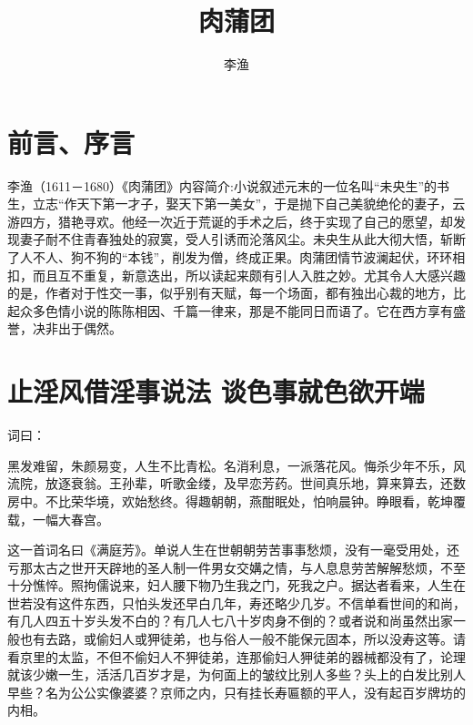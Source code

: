 \documentclass[a4paper,12pt,UTF8,twoside]{ctexbook}
\title{\heiti\zihao{0} 肉蒲团}
\author{李渔}
\date{}
\begin{document}
\maketitle
\tableofcontents

\frontmatter
\chapter{前言、序言}

李渔（1611－1680）《肉蒲团》内容简介:小说叙述元末的一位名叫“未央生”的书生，立志“作天下第一才子，娶天下第一美女”，于是抛下自己美貌绝伦的妻子，云游四方，猎艳寻欢。他经一次近于荒诞的手术之后，终于实现了自己的愿望，却发现妻子耐不住青春独处的寂寞，受人引诱而沦落风尘。未央生从此大彻大悟，斩断了人不人、狗不狗的“本钱”，削发为僧，终成正果。肉蒲团情节波澜起伏，环环相扣，而且互不重复，新意迭出，所以读起来颇有引人入胜之妙。尤其令人大感兴趣的是，作者对于性交一事，似乎别有天赋，每一个场面，都有独出心裁的地方，比起众多色情小说的陈陈相因、千篇一律来，那是不能同日而语了。它在西方享有盛誉，决非出于偶然。 

\mainmatter

\chapter{止淫风借淫事说法 谈色事就色欲开端}

词曰：

黑发难留，朱颜易变，人生不比青松。名消利息，一派落花风。悔杀少年不乐，风流院，放逐衰翁。王孙辈，听歌金缕，及早恋芳药。世间真乐地，算来算去，还数房中。不比荣华境，欢始愁终。得趣朝朝，燕酣眠处，怕响晨钟。睁眼看，乾坤覆载，一幅大春宫。

这一首词名曰《满庭芳》。单说人生在世朝朝劳苦事事愁烦，没有一毫受用处，还亏那太古之世开天辟地的圣人制一件男女交媾之情，与人息息劳苦解解愁烦，不至十分憔悴。照拘儒说来，妇人腰下物乃生我之门，死我之户。据达者看来，人生在世若没有这件东西，只怕头发还早白几年，寿还略少几岁。不信单看世间的和尚，有几人四五十岁头发不白的？有几人七八十岁肉身不倒的？或者说和尚虽然出家一般也有去路，或偷妇人或狎徒弟，也与俗人一般不能保元固本，所以没寿这等。请看京里的太监，不但不偷妇人不狎徒弟，连那偷妇人狎徒弟的器械都没有了，论理就该少嫩一生，活活几百岁才是，为何面上的皱纹比别人多些？头上的白发比别人早些？名为公公实像婆婆？京师之内，只有挂长寿匾额的平人，没有起百岁牌坊的内相。
\end{document}
